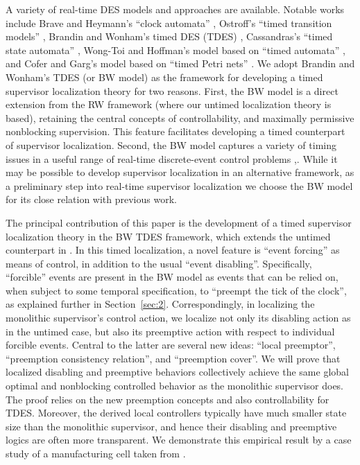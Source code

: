 \documentclass[twocolumn]{autart}
\begin{document}
A variety of real-time DES models and approaches are available.
Notable works include Brave and Heymann's ``clock automata''
\cite{BraveHeymann:88}, Ostroff's ``timed transition models''
\cite{Ost:90}, Brandin and Wonham's timed DES (TDES)
\cite{BrandinWonham:94}, Cassandras's ``timed state automata''
\cite{Cassandras:93}, Wong-Toi and Hoffman's model based on ``timed
automata'' \cite{WongToiHoffman:91}, and Cofer and Garg's model
based on ``timed Petri nets'' \cite{CoferGarg:96}. We adopt Brandin
and Wonham's TDES (or BW model) as the framework for developing a
timed supervisor localization theory for two reasons. First, the BW
model is a direct extension from the RW framework (where our untimed
localization theory is based), retaining the central concepts of
controllability, and maximally permissive nonblocking supervision.
This feature facilitates developing a timed counterpart of
supervisor localization. Second, the BW model captures a variety of
timing issues in a useful range of real-time discrete-event control
problems \cite{BrandinWonham:94},\cite[Chapter~9]{Wonham:2011a}.
While it may be possible to develop supervisor localization in an
alternative framework, as a preliminary step into real-time
supervisor localization we choose the BW model for its close
relation with previous work.

The principal contribution of this paper is the development of a
timed supervisor localization theory in the BW TDES framework, which
extends the untimed counterpart in
\cite{CaiWonham:2010a,CaiWonham:2010b}.  In this timed localization,
a novel feature is ``event forcing'' as means of control, in
addition to the usual ``event disabling''. Specifically,
``forcible'' events are present in the BW model as events that can
be relied on, when subject to some temporal specification, to
``preempt the tick of the clock'', as explained further in
Section~\ref{sec:2}. Correspondingly, in localizing the monolithic
supervisor's control action, we localize not only its disabling
action as in the untimed case, but also its preemptive action with
respect to individual forcible events.  Central to the
latter are several new ideas: ``local preemptor'', ``preemption
consistency relation'', and ``preemption cover''. We will prove
that localized disabling and preemptive behaviors collectively
achieve the same global optimal and nonblocking controlled behavior
as the monolithic supervisor does.  The proof relies on
the new preemption concepts and also controllability for TDES.
Moreover, the derived local controllers typically have much smaller
state size than the monolithic supervisor, and hence their disabling
and preemptive logics are often more transparent. We demonstrate
this empirical result by a case study of a manufacturing cell taken
from \cite{BrandinWonham:94}.
\end{document}
